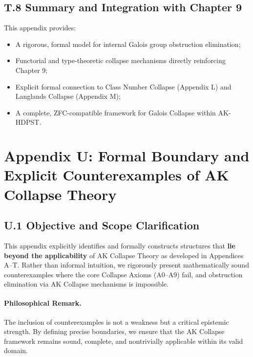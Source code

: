 \documentclass[11pt]{article}
\begin{document}
\subsection*{T.8 Summary and Integration with Chapter 9}

This appendix provides:

\begin{itemize}
    \item A rigorous, formal model for internal Galois group obstruction elimination;
    \item Functorial and type-theoretic collapse mechanisms directly reinforcing Chapter 9;
    \item Explicit formal connection to Class Number Collapse (Appendix L) and Langlands Collapse (Appendix M);
    \item A complete, ZFC-compatible framework for Galois Collapse within AK-HDPST.
\end{itemize}




\section*{Appendix U: Formal Boundary and Explicit Counterexamples of AK Collapse Theory}

\subsection*{U.1 Objective and Scope Clarification}

This appendix explicitly identifies and formally constructs structures that \textbf{lie beyond the applicability} of AK Collapse Theory as developed in Appendices A–T.  
Rather than informal intuition, we rigorously present mathematically sound counterexamples where the core Collapse Axioms (A0–A9) fail, and obstruction elimination via AK Collapse mechanisms is impossible.

\paragraph{Philosophical Remark.}  
The inclusion of counterexamples is not a weakness but a critical epistemic strength.  
By defining precise boundaries, we ensure that the AK Collapse framework remains sound, complete, and nontrivially applicable within its valid domain.
\end{document}
